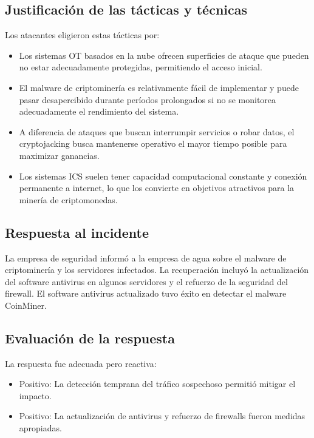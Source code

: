 \subsection{Justificación de las tácticas y técnicas}
Los atacantes eligieron estas tácticas por:

\begin{itemize}
    \item Los sistemas OT basados en la nube ofrecen superficies de ataque que pueden no estar adecuadamente protegidas, permitiendo el acceso inicial.
    
    \item El malware de criptominería es relativamente fácil de implementar y puede pasar desapercibido durante períodos prolongados si no se monitorea adecuadamente el rendimiento del sistema.
    
    \item A diferencia de ataques que buscan interrumpir servicios o robar datos, el cryptojacking busca mantenerse operativo el mayor tiempo posible para maximizar ganancias.
    
    \item Los sistemas ICS suelen tener capacidad computacional constante y conexión permanente a internet, lo que los convierte en objetivos atractivos para la minería de criptomonedas.
\end{itemize}

\subsection{Respuesta al incidente}
La empresa de seguridad informó a la empresa de agua sobre el malware de criptominería y los servidores infectados. La recuperación incluyó la actualización del software antivirus en algunos servidores y el refuerzo de la seguridad del firewall. El software antivirus actualizado tuvo éxito en detectar el malware CoinMiner.

\subsection{Evaluación de la respuesta}
La respuesta fue adecuada pero reactiva:

\begin{itemize}
    \item Positivo: La detección temprana del tráfico sospechoso permitió mitigar el impacto.
    \item Positivo: La actualización de antivirus y refuerzo de firewalls fueron medidas apropiadas.
\end{itemize}

